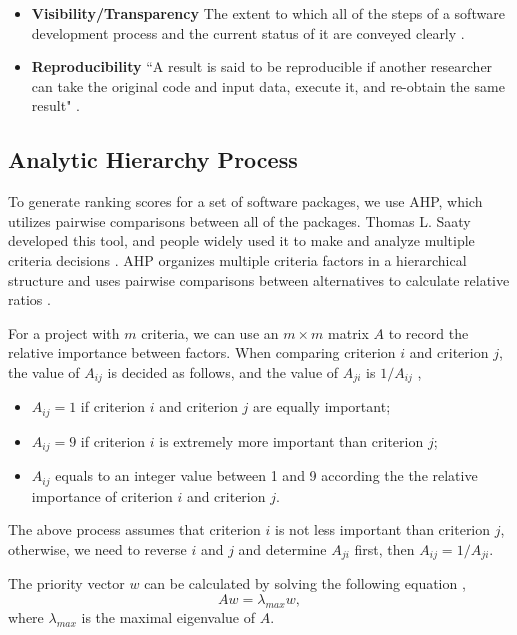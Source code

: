 \documentclass[preprint,12pt,authoryear]{elsarticle}
\begin{document}
\begin{itemize}
	\item \textbf{Visibility/Transparency} The extent to which all of the steps
	of a software development process and the current status of it are conveyed
	clearly \citep{ghezzi1991fundamentals}.

	\item \textbf{Reproducibility} ``A result is said to be reproducible if
	another researcher can take the original code and input data, execute it,
	and re-obtain the same result" \citep{BenureauAndRougier2017}.
\end{itemize}

\subsection{Analytic Hierarchy Process} \label{sec_AHP}

To generate ranking scores for a set of software packages, we use AHP, which
utilizes pairwise comparisons between all of the packages. Thomas L. Saaty
developed this tool, and people widely used it to make and analyze multiple
criteria decisions \citep{VaidyaEtAl2006}. AHP organizes multiple criteria
factors in a hierarchical structure and uses pairwise comparisons between
alternatives to calculate relative ratios \citep{Saaty1990}.

For a project with $ m $ criteria, we can use an $m\times m$ matrix $A$ to
record the relative importance between factors. When comparing criterion $i$ and
criterion $j$, the value of $A_{ij}$ is decided as follows, and the value of
$A_{ji}$ is $1/A_{ij}$ \citep{Saaty1990},

\begin{itemize}
	\item $A_{ij} = 1$ if criterion $i$ and criterion $j$ are equally important;
	\item $A_{ij} = 9$ if criterion $i$ is extremely more important than
	criterion $j$;
	\item $A_{ij}$ equals to an integer value between 1 and 9 according the the
	relative importance of criterion $i$ and criterion $j$.
\end{itemize}

The above process assumes that criterion $i$ is not less important than
criterion $j$, otherwise, we need to reverse $i$ and $j$ and determine $A_{ji}$
first, then $A_{ij} = 1/A_{ji}$.

The priority vector $w$ can be calculated by solving the following equation
\citep{Saaty1990}, 
\begin{equation} 
    Aw = \lambda_{max}w,
\end{equation}
where $\lambda_{max}$ is the maximal eigenvalue of $A$.
\end{document}
